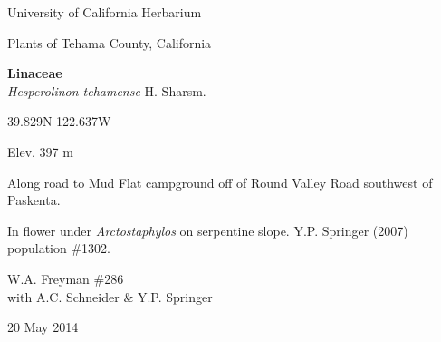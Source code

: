\documentclass[letterpaper,10pt]{article}
\begin{document}
\begin{minipage}[t]{0.40\textwidth}

\begin{center}
University of California Herbarium \\
\begin{large}
Plants of Tehama County, California \\
\end{large}
\vspace{\baselineskip}
\textbf{Linaceae} \\
\textit{Hesperolinon tehamense} H. Sharsm.\\
\end{center}

\begin{footnotesize}

\begin{multicols}{2}
39.829\textdegree N 122.637\textdegree W
\columnbreak
\begin{flushright}
Elev. 397 m
\end{flushright}
\end{multicols}

Along road to Mud Flat campground off of Round Valley Road southwest of Paskenta.
\vspace{\baselineskip}

In flower under \textit{Arctostaphylos} on serpentine slope. Y.P. Springer (2007) population \#1302.

\begin{multicols}{2}
W.A. Freyman \#286 \\
with A.C. Schneider \& Y.P. Springer
\columnbreak
\begin{flushright}
20 May 2014
\end{flushright}
\end{multicols}

\end{footnotesize}

\end{minipage}
%
\hspace{2cm}
%
\end{document}

